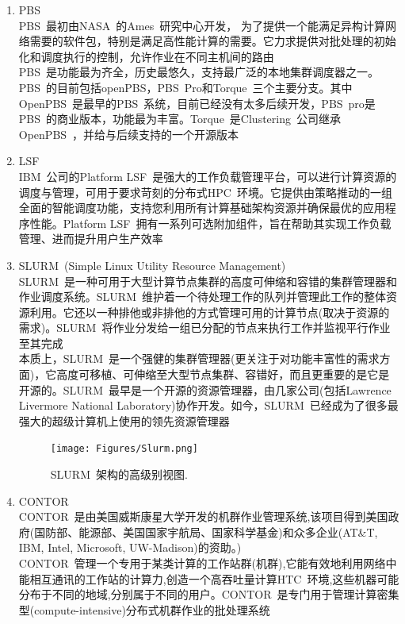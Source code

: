 \documentclass{article}      %
\begin{document}
\begin{enumerate}
	\item PBS~\\
		\textrm{PBS~}最初由\textrm{NASA~}的\textrm{Ames~}研究中心开发， 为了提供一个能满足异构计算网络需要的软件包，特别是满足高性能计算的需要。它力求提供对批处理的初始化和调度执行的控制，允许作业在不同主机间的路由\\
		\textrm{PBS~}是功能最为齐全，历史最悠久，支持最广泛的本地集群调度器之一。\textrm{PBS~}的目前包括\textrm{openPBS}，\textrm{PBS~Pro}和\textrm{Torque~}三个主要分支。其中\textrm{OpenPBS~}是最早的\textrm{PBS~}系统，目前已经没有太多后续开发，\textrm{PBS~pro}是\textrm{PBS~}的商业版本，功能最为丰富。\textrm{Torque~}是\textrm{Clustering~}公司继承\textrm{OpenPBS~}，并给与后续支持的一个开源版本
	\item LSF~\\
		\textrm{IBM~}公司的\textrm{Platform LSF~}是强大的工作负载管理平台，可以进行计算资源的调度与管理，可用于要求苛刻的分布式\textrm{HPC~}环境。它提供由策略推动的一组全面的智能调度功能，支持您利用所有计算基础架构资源并确保最优的应用程序性能。\textrm{Platform LSF~}拥有一系列可选附加组件，旨在帮助其实现工作负载管理、进而提升用户生产效率
	\item \textrm{SLURM~(Simple Linux Utility Resource Management)}\\
		\textrm{SLURM~}是一种可用于大型计算节点集群的高度可伸缩和容错的集群管理器和作业调度系统。\textrm{SLURM~}维护着一个待处理工作的队列并管理此工作的整体资源利用。它还以一种排他或非排他的方式管理可用的计算节点(取决于资源的需求)。\textrm{SLURM~}将作业分发给一组已分配的节点来执行工作并监视平行作业至其完成\\
		本质上，\textrm{SLURM~}是一个强健的集群管理器(更关注于对功能丰富性的需求方面)，它高度可移植、可伸缩至大型节点集群、容错好，而且更重要的是它是开源的。\textrm{SLURM~}最早是一个开源的资源管理器，由几家公司(包括\textrm{Lawrence Livermore National Laboratory})协作开发。如今，\textrm{SLURM~}已经成为了很多最强大的超级计算机上使用的领先资源管理器
\begin{figure}[h!]
\centering
\texttt{[image: Figures/Slurm.png]}
\caption{\small \textrm{SLURM~}架构的高级别视图.}%
\label{Fig:Slurm}
\end{figure}
	\item CONTOR~\\
		\textrm{CONTOR~}是由美国威斯康星大学开发的机群作业管理系统,该项目得到美国政府(国防部、能源部、美国国家宇航局、国家科学基金)和众多企业(\textrm{AT\&T, IBM, Intel, Microsoft, UW-Madison})的资助。)\\
		\textrm{CONTOR~}管理一个专用于某类计算的工作站群(机群),它能有效地利用网络中能相互通讯的工作站的计算力,创造一个高吞吐量计算\textrm{HTC~}环境,这些机器可能分布于不同的地域,分别属于不同的用户。\textrm{CONTOR~}是专门用于管理计算密集型(\textrm{compute-intensive})分布式机群作业的批处理系统
\end{enumerate}
\end{document}
